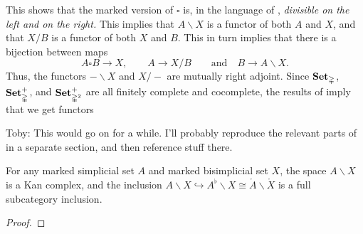 \documentclass[main.tex]{subfiles}
\begin{document}
This shows that the marked version of $\square$ is, in the language of \cite{qcats_vs_segal_spaces}, \emph{divisible on the left and on the right.} This implies that $A \backslash X$ is a functor of both $A$ and $X$, and that $X / B$ is a functor of both $X$ and $B$. This in turn implies that there is a bijection between maps
\begin{equation*}
  A \square B \to X,\qquad A \to X / B \qquad \text{and}\quad B \to A \backslash X.
\end{equation*}
Thus, the functors $- \backslash X$ and $X / -$ are mutually right adjoint. Since $\mathbf{Set}_{\mathbb{\Delta}}$, $\mathbf{Set}_{\mathbb{\Delta}}^{+}$, and $\mathbf{Set}_{\mathbb{\Delta}^{2}}^{+}$ are all finitely complete and cocomplete, the results of \cite[Sec. 7]{qcats_vs_segal_spaces} imply that we get functors

\begin{note}
  Toby: This would go on for a while. I'll probably reproduce the relevant parts of \cite{qcats_vs_segal_spaces} in a separate section, and then reference stuff there.
\end{note}

%

\begin{lemma}
  For any marked simplicial set $A$ and marked bisimplicial set $X$, the space $A \backslash X$ is a Kan complex, and the inclusion $A \backslash X \hookrightarrow A^{\flat} \backslash X \cong \mathring{A} \backslash \mathring{X}$ is a full subcategory inclusion.
\end{lemma}
\begin{proof}
  
\end{proof}
\end{document}
